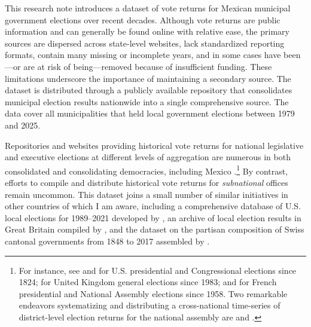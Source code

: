\documentclass[letter,12pt]{article}
\begin{document}
This research note introduces a dataset of vote returns for Mexican municipal government elections over recent decades. Although vote returns are public information and can generally be found online with relative ease, the primary sources are dispersed across state-level websites, lack standardized reporting formats, contain many missing or incomplete years, and in some cases have been---or are at risk of being---removed because of insufficient funding. These limitations underscore the importance of maintaining a secondary source. The dataset is distributed through a publicly available repository that consolidates municipal election results nationwide into a single comprehensive source. The data cover all municipalities that held local government elections between 1979 and 2025.


Repositories and websites providing historical vote returns for national legislative and executive elections at different levels of aggregation are numerous in both consolidated and consolidating democracies, including Mexico \citep{ife.2026}.\footnote{For instance, see \citet{mit.election.data.2017} and \citet{icpsr.us.hist.el.ret.2025} for U.S. presidential and Congressional elections since 1824; \citet{commons.library.uk.els.2023} for United Kingdom general elections since 1983; \citet{interieur.2026} and \citet{gougou.2025} for French presidential and National Assembly elections since 1958. Two remarkable endeavors systematizing and distributing a cross-national time-series of district-level election returns for the national assembly are \citet{lea.2009} and \citet{clea.2024}.} By contrast, efforts to compile and distribute historical vote returns for \emph{subnational} offices remain uncommon. This dataset joins a small number of similar initiatives in other countries of which I am aware, including a comprehensive database of U.S. local elections for 1989--2021 developed by \citet{am-loc-gov-els-database.2023}, an archive of local election results in Great Britain compiled by \citet{teale-loc-els-uk.2026}, and the dataset on the partisan composition of Swiss cantonal governments from 1848 to 2017 assembled by \citet{walter-emmenegger-Party-cantons-2018}. 
\end{document}
